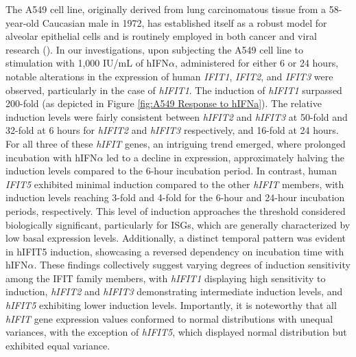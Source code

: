 The A549 cell line, originally derived from lung carcinomatous tissue from a 58-year-old Caucasian male in 1972, has established itself as a robust model for alveolar epithelial cells and is routinely employed in both cancer and viral research (\cite{Lieber1976ACells}). In our investigations, upon subjecting the A549 cell line to stimulation with 1,000 IU/mL of hIFN\(\alpha\), administered for either 6 or 24 hours, notable alterations in the expression of human \textit{IFIT1}, \textit{IFIT2}, and \textit{IFIT3} were observed, particularly in the case of \textit{hIFIT1}. The induction of \textit{hIFIT1} surpassed 200-fold (as depicted in Figure \ref{fig:A549 Response to hIFNa}). The relative induction levels were fairly consistent between \textit{hIFIT2} and \textit{hIFIT3} at 50-fold and 32-fold at 6 hours for \textit{hIFIT2} and \textit{hIFIT3} respectively, and 16-fold at 24 hours. For all three of these \textit{hIFIT} genes, an intriguing trend emerged, where prolonged incubation with hIFN\(\alpha\) led to a decline in expression, approximately halving the induction levels compared to the 6-hour incubation period. In contrast, human \textit{IFIT5} exhibited minimal induction compared to the other \textit{hIFIT} members, with induction levels reaching 3-fold and 4-fold for the 6-hour and 24-hour incubation periods, respectively. This level of induction approaches the threshold considered biologically significant, particularly for ISGs, which are generally characterized by low basal expression levels. Additionally, a distinct temporal pattern was evident in hIFIT5 induction, showcasing a reversed dependency on incubation time with hIFN\(\alpha\). These findings collectively suggest varying degrees of induction sensitivity among the IFIT family members, with \textit{hIFIT1} displaying high sensitivity to induction, \textit{hIFIT2} and \textit{hIFIT3} demonstrating intermediate induction levels, and \textit{hIFIT5} exhibiting lower induction levels. Importantly, it is noteworthy that all \textit{hIFIT} gene expression values conformed to normal distributions with unequal variances, with the exception of \textit{hIFIT5}, which displayed normal distribution but exhibited equal variance. 

